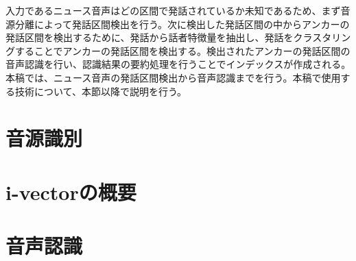 入力であるニュース音声はどの区間で発話されているか未知であるため、まず音源分離によって発話区間検出を行う。次に検出した発話区間の中からアンカーの発話区間を検出するために、発話から話者特徴量を抽出し、発話をクラスタリングすることでアンカーの発話区間を検出する。検出されたアンカーの発話区間の音声認識を行い、認識結果の要約処理を行うことでインデックスが作成される。本稿では、ニュース音声の発話区間検出から音声認識までを行う。本稿で使用する技術について、本節以降で説明を行う。

\section{音源識別}
\label{section:devide_audio}


\section{i-vectorの概要}


\section{音声認識}

